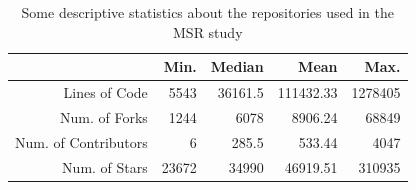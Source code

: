 \begin{table}[ht]
  \centering
  \caption{Some descriptive statistics about the repositories used in the MSR study}
  \begin{scriptsize}
 \begin{tabular}{rrrrr}
    \toprule
                       & Min.             & Median        & Mean             & Max. \\ \midrule
 Lines of Code         & \num{5543}       & \num{36161.5} & \num{111432.33}  & \num{1278405} \\
 Num. of Forks         & \num{1244}       & \num{6078}    & \num{8906.24}    & \num{68849} \\
 Num. of Contributors  & \num{6}          & \num{285.5}   & \num{533.44}     & \num{4047} \\
 Num. of Stars         & \num{23672}      & \num{34990}   & \num{46919.51}   & \num{310935} \\
 
    \bottomrule
 \end{tabular}
 \end{scriptsize}
 \label{tab:projects-statistics} 
 \end{table}


